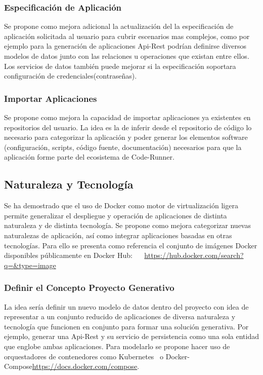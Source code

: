 \documentclass[a4paper,11pt]{book}
\begin{document}
\subsubsection{Especificación de Aplicación}

Se propone como mejora adicional la actualización del la especificación de aplicación solicitada al usuario para cubrir escenarios mas complejos, como por ejemplo para la  generación de aplicaciones  Api-Rest podrían definirse diversos modelos de datos junto con las relaciones u operaciones que existan entre ellos. Los servicios de datos también puede mejorar si la especificación soportara configuración de credenciales(contraseñas).

\subsubsection{Importar Aplicaciones}

Se propone como mejora la capacidad de importar aplicaciones ya existentes en repositorios del usuario. La idea es la de inferir desde el repositorio de código lo necesario para categorizar la aplicación y  poder generar los elementos software (configuración, scripts, código fuente, documentación) necesarios para que la aplicación forme parte del ecosistema de Code-Runner.  

\subsection{Naturaleza y Tecnología}

Se ha demostrado que el  uso de Docker como motor de virtualización ligera permite generalizar el despliegue y operación de aplicaciones de distinta naturaleza y de distinta tecnología. Se propone como mejora categorizar nuevas naturalezas de aplicación, así como integrar aplicaciones basadas en otras tecnologías. Para ello se presenta como referencia el conjunto de imágenes Docker disponibles públicamente en Docker Hub: ~\cite{dhub}    ~\url{https://hub.docker.com/search?q=&type=image}

\subsubsection{Definir el Concepto Proyecto Generativo}

La idea sería definir un nuevo modelo de datos dentro del proyecto con idea de representar a un conjunto reducido de aplicaciones de diversa naturaleza y tecnología que funcionen en conjunto para formar una solución generativa. Por ejemplo, generar una Api-Rest y su servicio de persistencia como una sola entidad que englobe ambas aplicaciones. Para modelarlo se propone hacer uso de orquestadores de contenedores como Kubernetes~\cite{kube} o Docker-Compose\url{https://docs.docker.com/compose}.  
\end{document}

